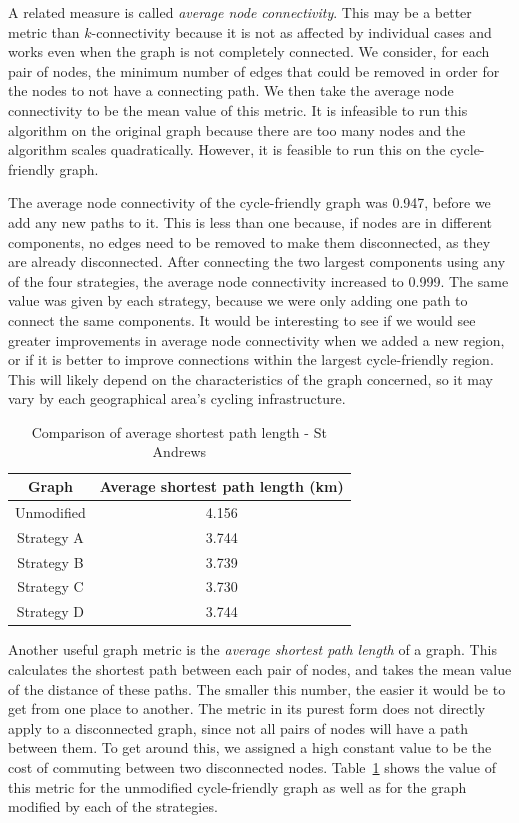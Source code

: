 \documentclass[12pt,a4paper]{report}
\begin{document}
A related measure is called \textit{average node connectivity}. This may be a better metric than $k$-connectivity because it is not as affected by individual cases and works even when the graph is not completely connected. We consider, for each pair of nodes, the minimum number of edges that could be removed in order for the nodes to not have a connecting path. We then take the average node connectivity to be the mean value of this metric. It is infeasible to run this algorithm on the original graph because there are too many nodes and the algorithm scales quadratically. However, it is feasible to run this on the cycle-friendly graph.

The average node connectivity of the cycle-friendly graph was 0.947, before we add any new paths to it. This is less than one because, if nodes are in different components, no edges need to be removed to make them disconnected, as they are already disconnected. After connecting the two largest components using any of the four strategies, the average node connectivity increased to 0.999. The same value was given by each strategy, because we were only adding one path to connect the same components. It would be interesting to see if we would see greater improvements in average node connectivity when we added a new region, or if it is better to improve connections within the largest cycle-friendly region. This will likely depend on the characteristics of the graph concerned, so it may vary by each geographical area's cycling infrastructure.

\begin{table}[ht]
    \centering
    \begin{tabular}{|c|c|}
        \hline
        Graph & Average shortest path length (km) \\
        \hline
        Unmodified & 4.156 \\
        Strategy A & 3.744 \\
        Strategy B & 3.739 \\
        Strategy C & 3.730 \\
        Strategy D & 3.744 \\
        \hline
    \end{tabular}
    \caption{Comparison of average shortest path length - St Andrews}
    \label{tab:avg st andrews}
\end{table}

Another useful graph metric is the \textit{average shortest path length} of a graph. This calculates the shortest path between each pair of nodes, and takes the mean value of the distance of these paths. The smaller this number, the easier it would be to get from one place to another. The metric in its purest form does not directly apply to a disconnected graph, since not all pairs of nodes will have a path between them. To get around this, we assigned a high constant value to be the cost of commuting between two disconnected nodes. Table~\ref{tab:avg st andrews} shows the value of this metric for the unmodified cycle-friendly graph as well as for the graph modified by each of the strategies.
\end{document}
